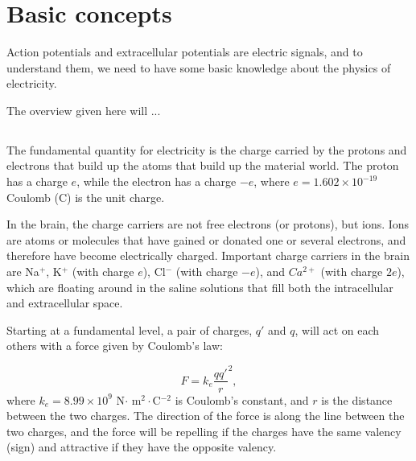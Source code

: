\section{Basic concepts} 
\label{sec:Basics}
Action potentials and extracellular potentials are electric signals, and to understand them, we need to have some basic knowledge about the physics of electricity. 

The overview given here will ...


\subsection{}


\subsubsection{}
The fundamental quantity for electricity is the charge carried by the protons and electrons that build up the atoms that build up the material world. The proton has a charge $e$, while the electron has a charge $-e$, where $e = 1.602\times10^{-19}$ Coulomb (C) is the unit charge. 

In the brain, the charge carriers are not free electrons (or protons), but ions. Ions are atoms or molecules that have gained or donated one or several electrons, and therefore have become electrically charged. Important charge carriers in the brain are Na$^+$, K$^+$ (with charge $e$), Cl$^-$ (with charge $-e$), and $Ca^{2+}$ (with charge $2e$), which are floating around in the saline solutions that fill both the intracellular and extracellular space.

Starting at a fundamental level, a pair of charges, $q'$ and $q$, will act on each others with a force given by Coulomb's law:

\begin{equation}
F = k_e\frac{q q'}r^2, 
\label{Basics:eq:CoulombF}
\end{equation}
where $k_e = 8.99\times10^9$ N$\cdot$ m$^2\cdot$C$^{-2}$ is Coulomb's constant, and $r$ is the distance between the two charges. The direction of the force is along the line between the two charges, and the force will be repelling if the charges have the same valency (sign) and attractive if they have the opposite valency. 

